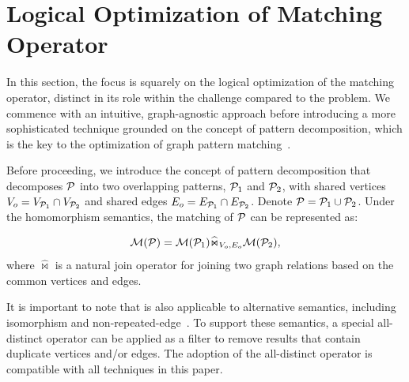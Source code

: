 \section{Logical Optimization of Matching Operator}
\label{sec:handling-match-operator}
In this section, the focus is squarely on the logical optimization of the matching operator, distinct in its role within the \spjm
challenge compared to the \spj problem. We commence with an intuitive, graph-agnostic approach before
introducing a more sophisticated technique grounded on the concept of pattern decomposition, which
is the key to the optimization of graph pattern matching~\cite{huge,GLogS}.

Before proceeding, we introduce the concept of pattern decomposition that decomposes $\mathcal{P}$ into two overlapping patterns, $\mathcal{P}_1$ and $\mathcal{P}_2$, with shared vertices $V_{o} = V_{\mathcal{P}_1} \cap V_{\mathcal{P}_2}$ and shared edges $E_{o} = E_{\mathcal{P}_1} \cap E_{\mathcal{P}_2}$.
Denote $\mathcal{P} = \mathcal{P}_1 \cup \mathcal{P}_2$. Under the homomorphism semantics, the matching of $\mathcal{P}$ can be represented as:

\begin{equation}
    \label{eq:join-pattern}
    \mathcal{M}(\mathcal{P}) = \mathcal{M}(\mathcal{P}_1) \widehat{\Join}_{V_{o}, E_{o}} \mathcal{M}(\mathcal{P}_2),
\end{equation}
where $\widehat{\Join}$ is a natural join operator for joining two graph relations based on the common vertices and edges.

It is important to note that  is also applicable to alternative semantics, including isomorphism and non-repeated-edge~\cite{angles2017foundations}. To support these semantics, a special all-distinct operator can be applied as a filter to remove results that contain duplicate vertices and/or edges. The adoption of the all-distinct operator is compatible with all techniques in this paper.


